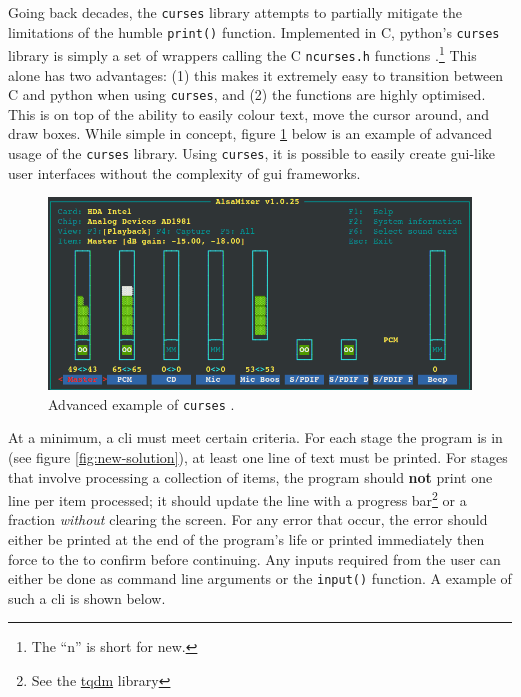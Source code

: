 \documentclass[11pt]{article}
\begin{document}
Going back decades, the \texttt{curses} \gls{library} attempts to partially mitigate the limitations of the humble \texttt{print()} function. Implemented in C, \Gls{python}'s \texttt{curses} \gls{library} is simply a set of wrappers calling the C \texttt{ncurses.h} functions \cite{curses-python} \cite{ncurses}.\footnote{The ``n'' is short for new.} This alone has two advantages: (1) this makes it extremely easy to transition between C and \Gls{python} when using \texttt{curses}, and (2) the functions are highly optimised. This is on top of the ability to easily colour text, move the cursor around, and draw boxes. While simple in concept, figure \ref{fig:ncurses-example} below is an example of advanced usage of the \texttt{curses} \gls{library}. Using \texttt{curses}, it is possible to easily create \acrshort{gui}-like \gls{user} interfaces without the complexity of \acrshort{gui} \glspl{framework}.

\begin{figure}[b!]
    \centering
    \includegraphics[width=\textwidth]{figures/ncurses_example.png}
    \caption{Advanced example of \texttt{curses} \cite{curses-api}.}
    \label{fig:ncurses-example}
\end{figure}

At a minimum, a \acrshort{cli} must meet certain criteria. For each stage the program is in (see figure \ref{fig:new-solution}), at least one line of text must be printed. For stages that involve processing a collection of items, the program should \textbf{not} print one line per item processed; it should update the line with a progress bar\footnote{See the \href{https://pypi.org/project/tqdm/}{tqdm} \gls{library}} or a fraction \textit{without} clearing the screen. For any error that occur, the error should either be printed at the end of the program's life or printed immediately then force to the to confirm before continuing. Any inputs required from the \gls{user} can either be done as command line arguments or the \texttt{input()} function. A example of such a \acrshort{cli} is shown below.
\end{document}
